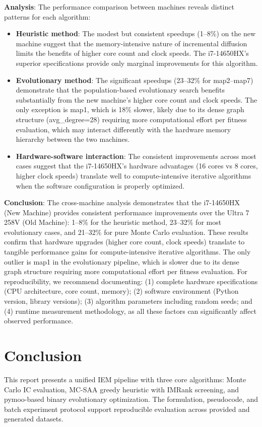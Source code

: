 \documentclass[onecolumn,a4paper,12pt]{IEEEtran}
\begin{document}
\textbf{Analysis}: The performance comparison between machines reveals distinct patterns for each algorithm:
\begin{itemize}
    \item \textbf{Heuristic method}: The modest but consistent speedups (1--8\%) on the new machine suggest that the memory-intensive nature of incremental diffusion limits the benefits of higher core count and clock speeds. The i7-14650HX's superior specifications provide only marginal improvements for this algorithm.
    \item \textbf{Evolutionary method}: The significant speedups (23--32\% for map2--map7) demonstrate that the population-based evolutionary search benefits substantially from the new machine's higher core count and clock speeds. The only exception is map1, which is 18\% slower, likely due to its dense graph structure (avg\_degree=28) requiring more computational effort per fitness evaluation, which may interact differently with the hardware memory hierarchy between the two machines.
    \item \textbf{Hardware-software interaction}: The consistent improvements across most cases suggest that the i7-14650HX's hardware advantages (16 cores vs 8 cores, higher clock speeds) translate well to compute-intensive iterative algorithms when the software configuration is properly optimized.
\end{itemize}

\textbf{Conclusion}: The cross-machine analysis demonstrates that the i7-14650HX (New Machine) provides consistent performance improvements over the Ultra 7 258V (Old Machine): 1--8\% for the heuristic method, 23--32\% for most evolutionary cases, and 21--32\% for pure Monte Carlo evaluation. These results confirm that hardware upgrades (higher core count, clock speeds) translate to tangible performance gains for compute-intensive iterative algorithms. The only outlier is map1 in the evolutionary pipeline, which is slower due to its dense graph structure requiring more computational effort per fitness evaluation. For reproducibility, we recommend documenting: (1) complete hardware specifications (CPU architecture, core count, memory); (2) software environment (Python version, library versions); (3) algorithm parameters including random seeds; and (4) runtime measurement methodology, as all these factors can significantly affect observed performance.

\section{Conclusion}
This report presents a unified IEM pipeline with three core algorithms: Monte Carlo IC evaluation, MC-SAA greedy heuristic with IMRank screening, and pymoo-based binary evolutionary optimization. The formulation, pseudocode, and batch experiment protocol support reproducible evaluation across provided and generated datasets.
\end{document}
